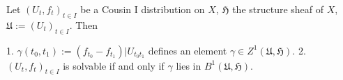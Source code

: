 Let $(U_t, f_t)_{t \in I}$ be a Cousin I distribution on $X$, $\mathfrak{H}$ the structure sheaf of $X$, $\mathfrak{U} := (U_t)_{t \in I}$. Then

1. $\gamma(t_0, t_1) := (f_{t_0} - f_{t_1})|U_{t_0t_1}$ defines an element $\gamma \in Z^1(\mathfrak{U}, \mathfrak{H})$.
2. $(U_t, f_t)_{t \in I}$ is solvable if and only if $\gamma$ lies in $B^1(\mathfrak{U}, \mathfrak{H})$.
